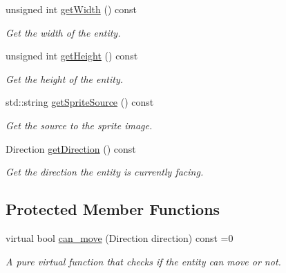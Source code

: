 \begin{DoxyCompactItemize}
unsigned int \hyperlink{classEntity_a002be2c6f13d59bff1806ef8815478d5}{get\+Width} () const
\begin{DoxyCompactList}\small\item\em Get the width of the entity. \end{DoxyCompactList}\item 
unsigned int \hyperlink{classEntity_a5bbd1da83a9212d0de7e6d0dca659bf8}{get\+Height} () const
\begin{DoxyCompactList}\small\item\em Get the height of the entity. \end{DoxyCompactList}\item 
std\+::string \hyperlink{classEntity_a0d10637b4a1e31e139fcf992227d4ef8}{get\+Sprite\+Source} () const
\begin{DoxyCompactList}\small\item\em Get the source to the sprite image. \end{DoxyCompactList}\item 
Direction \hyperlink{classEntity_a6e758491533926eb0c27d4ddad83a210}{get\+Direction} () const
\begin{DoxyCompactList}\small\item\em Get the direction the entity is currently facing. \end{DoxyCompactList}\end{DoxyCompactItemize}
\subsection*{Protected Member Functions}
\begin{DoxyCompactItemize}
\item 
virtual bool \hyperlink{classEntity_a6a8f776c063333b5756e720d9b6dfeac}{can\+\_\+move} (Direction direction) const =0
\begin{DoxyCompactList}\small\item\em A pure virtual function that checks if the entity can move or not. \end{DoxyCompactList}\end{DoxyCompactItemize}
